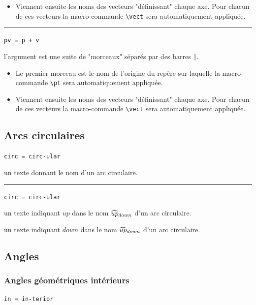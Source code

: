 \documentclass[12pt,a4paper]{book}
\newcommand\env[1]{\texttt{#1}}
\newcommand\macro[1]{\env{\textbackslash{}#1}}
\theoremstyle{definition}
\newcommand\separation{
	\medskip
	\hfill\rule{0.5\textwidth}{0.75pt}\hfill
	\medskip
}
\newcommand\mwhyprefix[2]{%
	\texttt{#1 = #1-#2}%
}
\newcommand\prefix[1]{%
	\texttt{#1}%
}
\begin{document}
{{\begin{itemize}[topsep=0pt]
	\item Viennent ensuite les noms des vecteurs "définissant" chaque axe. Pour chacun de ces vecteurs la macro-commande \macro{vect} sera automatiquement appliquée.
\end{itemize}


\separation

 \hfill \prefix{pv = p + v}

\IDarg{} l'argument est une suite de "morceaux" séparés par des barres \verb+|+.

\begin{itemize}[topsep=0pt]
	\item Le premier morceau est le nom de l'origine du repère sur laquelle la macro-commande \macro{pt} sera automatiquement appliquée.

	\item Viennent ensuite les noms des vecteurs "définissant" chaque axe. Pour chacun de ces vecteurs la macro-commande \macro{vect} sera automatiquement appliquée.
\end{itemize}


\subsection{Arcs circulaires}



 \hfill \mwhyprefix{circ}{ular}

\IDarg{} un texte donnant le nom d'un arc circulaire.


\separation


 \hfill \mwhyprefix{circ}{ular}

 un texte indiquant $up$ dans le nom $\circarc*{up}{down}$ d'un arc circulaire.

 un texte indiquant $down$ dans le nom $\circarc*{up}{down}$ d'un arc circulaire.


\subsection{Angles}

\subsubsection{Angles géométriques \og intérieurs \fg}



 \hfill \mwhyprefix{in}{terior}

}}
\end{document}
